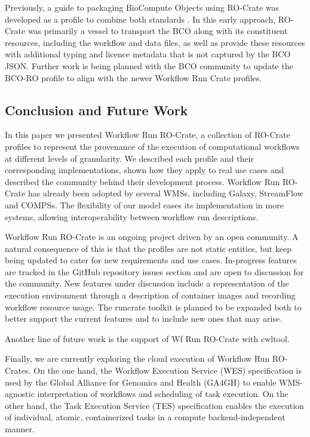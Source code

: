 Previously, a guide to packaging BioCompute Objects using RO-Crate  was developed as a profile to combine both standards \cite{Soiland-Reyes 2021}.
In this early approach, RO-Crate was primarily a vessel to transport the BCO along with its constituent resources, including the workflow and data files, as well as provide these resources with additional typing and licence metadata that is not captured by the BCO JSON. 
Further work is being planned with the BCO community to update the BCO-RO profile to align with the newer Workflow Run Crate profiles. 

\subsection{Conclusion and Future Work}\label{ch54:conclusion}

In this paper we presented Workflow Run RO-Crate, a collection of RO-Crate profiles to represent the provenance of the execution of computational workflows at different levels of granularity.
We described each profile and their corresponding implementations, shown how they apply to real use cases and described the community behind their development process.
Workflow Run RO-Crate has already been adopted by several WMSs, including Galaxy, StreamFlow and COMPSs. The flexibility of our model eases its implementation in more systems, allowing interoperability between workflow run descriptions.

Workflow Run RO-Crate is an ongoing project driven by an open community.
A natural consequence of this is that the profiles are not static entities, but keep being updated to cater for new requirements and use cases.
In-progress features are tracked in the GitHub repository issues section  and are open to discussion for the community.
New features under discussion include a representation of the execution environment through a description of container images and recording workflow resource usage.
The runcrate toolkit is planned to be expanded both to better support the current features and to include new ones that may arise.

Another line of future work is the support of Wf Run RO-Crate with cwltool.

Finally, we are currently exploring the cloud execution of Workflow Run RO-Crates.
On the one hand, the Workflow Execution Service (WES) specification is used by the Global Alliance for Genomics and Health (GA4GH) \cite{Rehm 2021} to enable WMS-agnostic interpretation of workflows and scheduling of task execution. On the other hand, the Task Execution Service (TES) specification enables the execution of individual, atomic, containerized tasks in a compute backend-independent manner.

